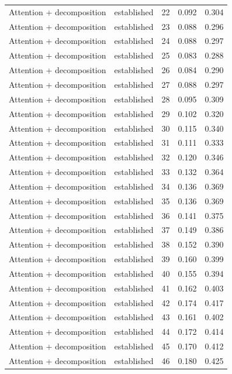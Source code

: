 \begin{tabular}{llrrr}
Attention + decomposition & established & 22 & 0.092 & 0.304 \\
Attention + decomposition & established & 23 & 0.088 & 0.296 \\
Attention + decomposition & established & 24 & 0.088 & 0.297 \\
Attention + decomposition & established & 25 & 0.083 & 0.288 \\
Attention + decomposition & established & 26 & 0.084 & 0.290 \\
Attention + decomposition & established & 27 & 0.088 & 0.297 \\
Attention + decomposition & established & 28 & 0.095 & 0.309 \\
Attention + decomposition & established & 29 & 0.102 & 0.320 \\
Attention + decomposition & established & 30 & 0.115 & 0.340 \\
Attention + decomposition & established & 31 & 0.111 & 0.333 \\
Attention + decomposition & established & 32 & 0.120 & 0.346 \\
Attention + decomposition & established & 33 & 0.132 & 0.364 \\
Attention + decomposition & established & 34 & 0.136 & 0.369 \\
Attention + decomposition & established & 35 & 0.136 & 0.369 \\
Attention + decomposition & established & 36 & 0.141 & 0.375 \\
Attention + decomposition & established & 37 & 0.149 & 0.386 \\
Attention + decomposition & established & 38 & 0.152 & 0.390 \\
Attention + decomposition & established & 39 & 0.160 & 0.399 \\
Attention + decomposition & established & 40 & 0.155 & 0.394 \\
Attention + decomposition & established & 41 & 0.162 & 0.403 \\
Attention + decomposition & established & 42 & 0.174 & 0.417 \\
Attention + decomposition & established & 43 & 0.161 & 0.402 \\
Attention + decomposition & established & 44 & 0.172 & 0.414 \\
Attention + decomposition & established & 45 & 0.170 & 0.412 \\
Attention + decomposition & established & 46 & 0.180 & 0.425 \\

\end{tabular}
